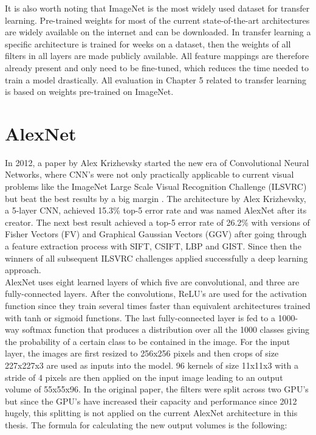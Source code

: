 It is also worth noting that ImageNet is the most widely used dataset for transfer learning. Pre-trained weights for most of the current state-of-the-art architectures are widely available on the internet and can be downloaded. In transfer learning a specific architecture is trained for weeks on a dataset, then the weights of all filters in all layers are made publicly available. All feature mappings are therefore already present and only need to be fine-tuned, which reduces the time needed to train a model drastically. All evaluation in Chapter 5 related to transfer learning is based on weights pre-trained on ImageNet.

\section{AlexNet}

In 2012, a paper by Alex Krizhevsky started the new era of Convolutional Neural Networks, where CNN's were not only practically applicable to current visual problems like the ImageNet Large Scale Visual Recognition Challenge (ILSVRC) but beat the best results by a big margin \cite{krizhevsky2012imagenet, imagenet}. The architecture by Alex Krizhevsky, a 5-layer CNN, achieved 15.3\% top-5 error rate and was named AlexNet after its creator. The next best result achieved a top-5 error rate of 26.2\% with versions of Fisher Vectors (FV) and Graphical Gaussian Vectors (GGV) after going through a feature extraction process with SIFT, CSIFT, LBP and GIST. Since then the winners of all subsequent ILSVRC challenges applied successfully a deep learning approach. \\

AlexNet uses eight learned layers of which five are convolutional, and three are fully-connected layers. After the convolutions, ReLU's are used for the activation function since they train several times faster than equivalent architectures trained with tanh or sigmoid functions. The last fully-connected layer is fed to a 1000-way softmax function that produces a distribution over all the 1000 classes giving the probability of a certain class to be contained in the image. For the input layer, the images are first resized to 256x256 pixels and then crops of size 227x227x3 are used as inputs into the model. 96 kernels of size 11x11x3 with a stride of 4 pixels are then applied on the input image leading to an output volume of 55x55x96. In the original paper, the filters were split across two GPU's but since the GPU's have increased their capacity and performance since 2012 hugely, this splitting is not applied on the current AlexNet architecture in this thesis. The formula for calculating the new output volumes is the following: \\

